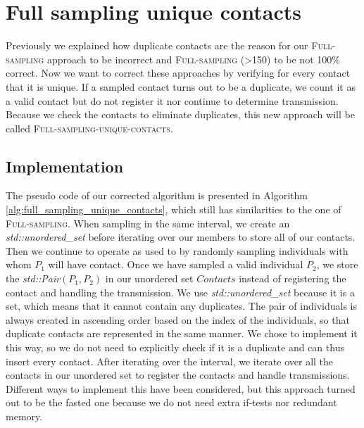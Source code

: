 \section{Full sampling unique contacts}
\label{sec:full_sampling_unique_contacts}
Previously we explained how duplicate contacts are the reason for our \textsc{Full-sampling} approach to be incorrect and \textsc{Full-sampling (>150)} to be not 100\% correct. Now we want to correct these approaches by verifying for every contact that it is unique. If a sampled contact turns out to be a duplicate, we count it as a valid contact but do not register it nor continue to determine transmission. Because we check the contacts to eliminate duplicates, this new approach will be called \textsc{Full-sampling-unique-contacts}.

\subsection{Implementation}
\label{subsec:implementation_fsuc}
The pseudo code of our corrected algorithm is presented in Algorithm \ref{alg:full_sampling_unique_contacts}, which still has similarities to the one of \textsc{Full-sampling}. When sampling in the same interval, we create an \textit{std::unordered\_set} before iterating over our members to store all of our contacts. 
Then we continue to operate as used to by randomly sampling individuals with whom $P_{1}$ will have contact. Once we have sampled a valid individual $P_{2}$, we store the \textit{std::Pair}$(P_{1},P_{2})$ in our unordered set $Contacts$ instead of registering the contact and handling the transmission. We use \textit{std::unordered\_set} because it is a set, which means that it cannot contain any duplicates. The pair of individuals is always created in ascending order based on the index of the individuals, so that duplicate contacts are represented in the same manner. We chose to implement it this way, so we do not need to explicitly check if it is a duplicate and can thus insert every contact. After iterating over the interval, we iterate over all the contacts in our unordered set to register the contacts and handle transmissions. Different ways to implement this have been considered, but this approach turned out to be the fasted one because we do not need extra if-tests nor redundant memory.

